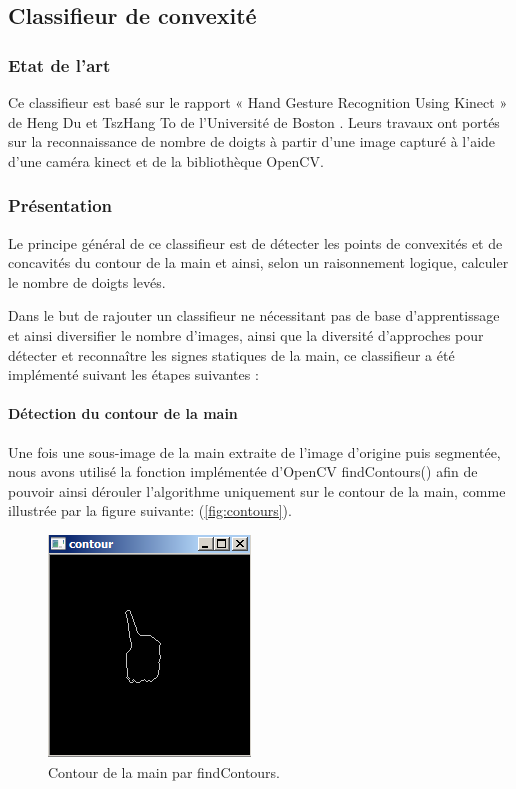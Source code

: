 \subsection{Classifieur de convexité}
\subsubsection{Etat de l'art}
Ce classifieur est basé sur le rapport « Hand Gesture Recognition Using Kinect » de Heng Du et TszHang To de l’Université de Boston \cite{hengDuEtAl}.  Leurs travaux ont portés sur la reconnaissance de nombre de doigts à partir d’une image capturé à l’aide d’une caméra kinect et de la bibliothèque OpenCV. 

\subsubsection{Présentation}

Le principe général de ce classifieur est de détecter les points de convexités et de concavités du contour de la main et ainsi, selon un raisonnement logique, calculer le nombre de doigts levés.

Dans le but de rajouter un classifieur ne nécessitant pas de base d’apprentissage et ainsi diversifier le nombre d’images, ainsi que la diversité d’approches pour détecter et reconnaître les signes statiques de la main, ce classifieur a été implémenté suivant les étapes suivantes :

\paragraph{Détection du contour de la main}
Une fois une sous-image de la main extraite de l’image d’origine puis segmentée, nous avons utilisé la fonction implémentée d’OpenCV findContours() afin de pouvoir ainsi dérouler l’algorithme uniquement sur le contour de la main, comme illustrée par la figure suivante:  (\autoref{fig:contours}).

\begin{figure}[htb!]
\centerline{\includegraphics{contours.png}}
\caption{Contour de la main par findContours.}
\label{fig:contours}
\end{figure}

